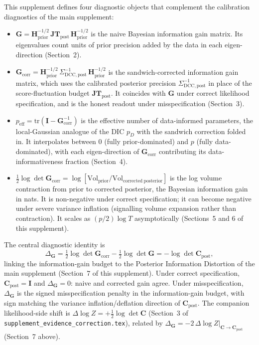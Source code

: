 \documentclass[11pt]{article}
\begin{document}
This supplement defines four diagnostic objects that complement the calibration diagnostics of the main supplement:
\begin{itemize}
\item $\mathbf G = \mathbf H_{\mathrm{prior}}^{-1/2}\, \mathbf{JT}_{\mathrm{post}}\, \mathbf H_{\mathrm{prior}}^{-1/2}$ is the naive Bayesian information gain matrix. Its eigenvalues count units of prior precision added by the data in each eigen-direction (Section~2).
\item $\mathbf G_{\mathrm{corr}} = \mathbf H_{\mathrm{prior}}^{-1/2}\, \Sigma_{\mathrm{DCC},\mathrm{post}}^{-1}\, \mathbf H_{\mathrm{prior}}^{-1/2}$ is the sandwich-corrected information gain matrix, which uses the calibrated posterior precision $\Sigma_{\mathrm{DCC},\mathrm{post}}^{-1}$ in place of the score-fluctuation budget $\mathbf{JT}_{\mathrm{post}}$. It coincides with $\mathbf G$ under correct likelihood specification, and is the honest readout under misspecification (Section~3).
\item $p_{\mathrm{eff}} = \mathrm{tr}(\mathbf I - \mathbf G_{\mathrm{corr}}^{-1})$ is the effective number of data-informed parameters, the local-Gaussian analogue of the DIC $p_D$ with the sandwich correction folded in. It interpolates between $0$ (fully prior-dominated) and $p$ (fully data-dominated), with each eigen-direction of $\mathbf G_{\mathrm{corr}}$ contributing its data-informativeness fraction (Section~4).
\item $\tfrac{1}{2}\log\det \mathbf G_{\mathrm{corr}} = \log[\mathrm{Vol}_{\mathrm{prior}} / \mathrm{Vol}_{\mathrm{corrected\ posterior}}]$ is the log volume contraction from prior to corrected posterior, the Bayesian information gain in nats. It is non-negative under correct specification; it can become negative under severe variance inflation (signalling volume expansion rather than contraction). It scales as $(p/2)\log T$ asymptotically (Sections~5 and 6 of this supplement).
\end{itemize}

The central diagnostic identity is
\begin{equation}
\Delta_{\mathbf G}
=
\tfrac{1}{2}\log\det \mathbf G_{\mathrm{corr}}
-
\tfrac{1}{2}\log\det \mathbf G
=
-\log\det \mathbf C_{\mathrm{post}},
\label{eq:summary-identity}
\end{equation}
linking the information-gain budget to the Posterior Information Distortion of the main supplement (Section~7 of this supplement). Under correct specification, $\mathbf C_{\mathrm{post}} = \mathbf I$ and $\Delta_{\mathbf G} = 0$: naive and corrected gain agree. Under misspecification, $\Delta_{\mathbf G}$ is the signed misspecification penalty in the information-gain budget, with sign matching the variance inflation/deflation direction of $\mathbf C_{\mathrm{post}}$. The companion likelihood-side shift is $\Delta\log Z = +\tfrac{1}{2}\log\det \mathbf C$ (Section~3 of \texttt{supplement\_evidence\_correction.tex}), related by $\Delta_{\mathbf G} = -2\, \Delta\log Z|_{\mathbf C\to\mathbf C_{\mathrm{post}}}$ (Section~7 above).
\end{document}
